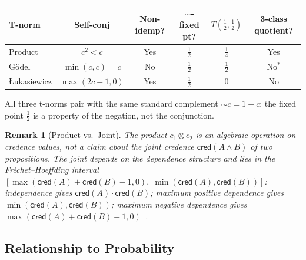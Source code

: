 \documentclass[11pt,a4paper]{article}
\newtheorem{remark}[theorem]{Remark}
\newcommand{\cred}{\mathsf{cred}}
\newcommand{\negc}{\mathord{\sim}}
\newcommand{\conjc}{\otimes}
\begin{document}
\begin{center}
\small
\begin{tabular}{lccccc}
\toprule
\textbf{T-norm} & \textbf{Self-conj} & \textbf{Non-idemp?}
  & \textbf{$\negc$-fixed pt?} & $T(\tfrac{1}{2},\tfrac{1}{2})$
  & \textbf{3-class quotient?} \\
\midrule
Product & $c^2 < c$ & Yes & $\tfrac{1}{2}$ & $\tfrac{1}{4}$
  & Yes \\
G\"odel & $\min(c,c) = c$ & No & $\tfrac{1}{2}$ & $\tfrac{1}{2}$
  & No$^*$ \\
\L ukasiewicz & $\max(2c{-}1,0)$ & Yes & $\tfrac{1}{2}$ & $0$
  & No \\
\bottomrule
\end{tabular}
\normalsize
{}
\label{tab:tnorm-comparison}
\end{center}

All three t-norms pair with the same standard complement
$\negc c = 1 - c$; the fixed point $\tfrac{1}{2}$ is a property
of the negation, not the conjunction.

\begin{remark}[Product vs.\ Joint]
\label{rem:product-vs-joint}
The product $c_1 \conjc c_2$ is an algebraic operation on
credence values, not a claim about the joint credence
$\cred(A \land B)$ of two propositions.
The joint depends on the dependence structure and lies in the
Fr\'echet--Hoeffding interval
$[\max(\cred(A) + \cred(B) - 1, 0),\; \min(\cred(A), \cred(B))]$:
independence gives $\cred(A) \cdot \cred(B)$;
maximum positive dependence gives $\min(\cred(A), \cred(B))$;
maximum negative dependence gives
$\max(\cred(A) + \cred(B) - 1, 0)$~\cite{nelsen2006}.
\end{remark}

\subsection{Relationship to Probability}
\end{document}
